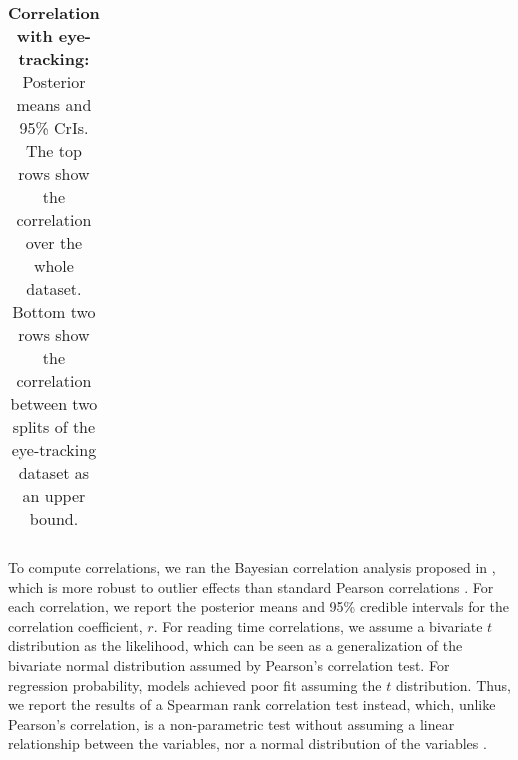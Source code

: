 \documentclass[12pt]{article}
\newcommand{\change}[1]{\textcolor{blue}{#1}}
\newcommand{\todo}[1]{\textcolor{red}{ TODO: #1 }}
\begin{document}
{{\begin{table}[ht]
\begin{tabular}{ c | c | c | c | c }
    \bottomrule
    \end{tabular}
    \caption{\textbf{Correlation with eye-tracking:} Posterior means and 95\% CrIs. The top rows show the correlation over the whole dataset. Bottom two rows show the correlation between two splits of the eye-tracking dataset as an upper bound.}
    \label{tab:motr_eyetr_cor}
\end{table}
}


To compute correlations, we ran the Bayesian correlation analysis proposed in \cite{behseta2009bayesian}, which is more robust to outlier effects than standard Pearson correlations \citep{Matzke2017}. For each correlation, we report the posterior means and 95\% credible intervals for the correlation coefficient, $r$. For reading time correlations, we assume a bivariate $t$ distribution as the likelihood, which can be seen as a generalization of the bivariate normal distribution assumed by Pearson's correlation test. For regression probability, models achieved poor fit assuming the $t$ distribution. Thus, we report the results of a Spearman rank correlation test instead, which, unlike Pearson's correlation, is a non-parametric test without assuming a linear relationship between the variables, nor a normal distribution of the variables \citep{spearman1961proof}.

}
\end{document}
